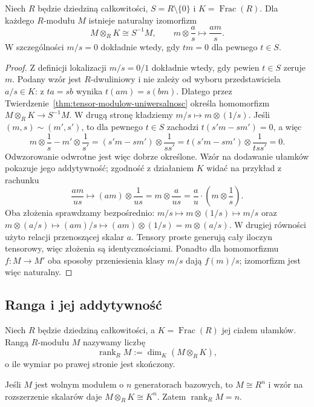\begin{stwierdzenie}
\label{prop:tensor-cialo-ulamkow}
Niech $R$ będzie dziedziną całkowitości,
$S=R\setminus\{0\}$ i $K=\operatorname{Frac}(R)$.
Dla każdego $R$-modułu $M$ istnieje naturalny izomorfizm
\[
M\otimes_R K\cong S^{-1}M,
\qquad m\otimes\frac{a}{s}\longmapsto\frac{am}{s}.
\]
W szczególności $m/s=0$ dokładnie wtedy, gdy
$tm=0$ dla pewnego $t\in S$.
\end{stwierdzenie}
\begin{proof}
Z definicji lokalizacji
$m/s=0/1$ dokładnie wtedy, gdy pewien $t\in S$
zeruje $m$. Podany wzór jest $R$-dwuliniowy i nie zależy
od wyboru przedstawiciela $a/s\in K$: z $ta=sb$ wynika
$t(am)=s(bm)$. Dlatego przez
Twierdzenie~\ref{thm:tensor-modulow-uniwersalnosc}
określa homomorfizm $M\otimes_R K\to S^{-1}M$.
W drugą stronę kładziemy $m/s\mapsto m\otimes(1/s)$.
Jeśli $(m,s)\sim(m',s')$, to dla pewnego $t\in S$
zachodzi $t(s'm-sm')=0$, a więc
\[
m\otimes\frac1s-m'\otimes\frac1{s'}
=(s'm-sm')\otimes\frac1{ss'}
=t(s'm-sm')\otimes\frac1{tss'}=0.
\]
Odwzorowanie odwrotne jest więc dobrze określone.
Wzór na dodawanie ułamków pokazuje jego addytywność;
zgodność z działaniem $K$ widać na przykład z rachunku
\[
 \frac{am}{us}\longmapsto (am)\otimes\frac1{us}
 =m\otimes\frac{a}{us}
 =\frac au\cdot\left(m\otimes\frac1s\right).
\]
Oba złożenia sprawdzamy bezpośrednio:
$m/s\mapsto m\otimes(1/s)\mapsto m/s$ oraz
$m\otimes(a/s)\mapsto(am)/s\mapsto(am)\otimes(1/s)=m\otimes(a/s)$.
W drugiej równości użyto relacji przenoszącej skalar $a$.
Tensory proste generują cały iloczyn tensorowy,
więc złożenia są identycznościami.
Ponadto dla homomorfizmu $f:M\to M'$ oba sposoby
przeniesienia klasy $m/s$ dają $f(m)/s$;
izomorfizm jest więc naturalny.
\end{proof}

\subsection*{Ranga i jej addytywność}

\begin{definicja}
\label{def:ranga-modulu}
Niech $R$ będzie dziedziną całkowitości, a
$K=\operatorname{Frac}(R)$ jej ciałem ułamków.
Rangą $R$-modułu $M$ nazywamy liczbę
\[
\operatorname{rank}_R M
:=
\dim_K(M\otimes_R K),
\]
o ile wymiar po prawej stronie jest skończony.
\end{definicja}

Jeśli $M$ jest wolnym modułem o $n$ generatorach bazowych, to
$M\cong R^n$ i wzór na rozszerzenie skalarów daje
$M\otimes_R K\cong K^n$. Zatem $\operatorname{rank}_R M=n$.


